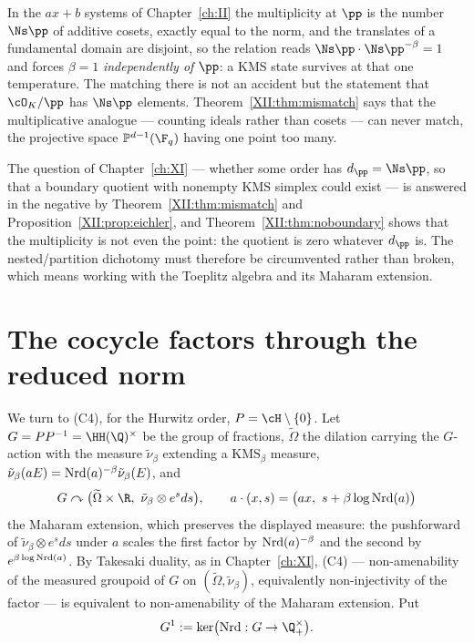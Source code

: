 \begin{remark}\label{XII:rem:affine}
In the $ax+b$ systems of Chapter~\ref{ch:II} the multiplicity at $\pp$ is the number
$\Ns\pp$ of additive cosets, exactly equal to the norm, and the translates of a fundamental
domain are disjoint, so the relation reads $\Ns\pp\cdot\Ns\pp^{-\beta}=1$ and forces $\beta=1$
\emph{independently of $\pp$}: a KMS state survives at that one temperature. The matching there is not an accident but the statement
that $\cO_K/\pp$ has $\Ns\pp$ elements. Theorem~\ref{XII:thm:mismatch} says that the
multiplicative analogue --- counting ideals rather than cosets --- can never match, the
projective space $\mathbb P^{d-1}(\F_q)$ having one point too many.
\end{remark}

\begin{corollary}\label{XII:cor:dichotomy}
The question of Chapter~\ref{ch:XI} --- whether some order has $d_\pp=\Ns\pp$, so that a boundary
quotient with nonempty $\mathrm{KMS}$ simplex could exist --- is answered in the negative by
Theorem~\ref{XII:thm:mismatch} and Proposition~\ref{XII:prop:eichler}, and Theorem~\ref{XII:thm:noboundary}
shows that the multiplicity is not even the point: the quotient is zero whatever $d_\pp$ is.
The nested/partition dichotomy must therefore be circumvented rather than broken, which
means working with the Toeplitz algebra and its Maharam extension.
\end{corollary}

\section{The cocycle factors through the reduced norm}

We turn to (C4), for the Hurwitz order, $P=\cH\setminus\{0\}$. Let $G=PP^{-1}=\HH(\Q)^\times$
be the group of fractions, $\widetilde\Omega$ the dilation carrying the $G$-action with the
measure $\tilde\nu_\beta$ extending a $\mathrm{KMS}_\beta$ measure, $\tilde\nu_\beta(aE)=\operatorname{Nrd}(a)^{-\beta}\tilde\nu_\beta(E)$,
and
\[
G\curvearrowright\bigl(\widetilde\Omega\times\R,\ \tilde\nu_\beta\otimes e^{s}ds\bigr),
\qquad
a\cdot(x,s)=\bigl(ax,\ s+\beta\log\Nrd(a)\bigr)
\]
the Maharam extension, which preserves the displayed measure: the pushforward of
$\tilde\nu_\beta\otimes e^sds$ under $a$ scales the first factor by $\operatorname{Nrd}(a)^{-\beta}$ and the
second by $e^{\beta\log\operatorname{Nrd}(a)}$. By Takesaki duality, as in Chapter~\ref{ch:XI}, (C4) --- non-amenability
of the measured groupoid of $G$ on $(\widetilde\Omega,\tilde\nu_\beta)$, equivalently
non-injectivity of the factor --- is equivalent to non-amenability of the Maharam extension.
Put
\[
G^1:=\ker\bigl(\Nrd:G\to\Q^\times_+\bigr).
\]


